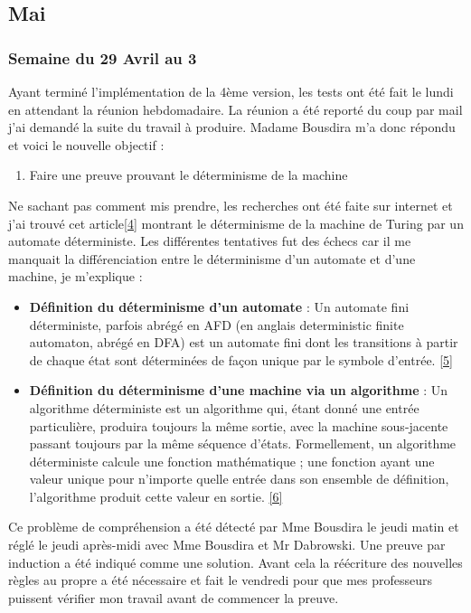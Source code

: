 \documentclass[10pt,a4paper]{article}
\begin{document}
		\subsection{Mai}
		
		\subsubsection{Semaine du 29 Avril au 3}
		Ayant terminé l'implémentation de la 4ème version, les tests ont été fait le lundi en attendant la réunion hebdomadaire. La réunion a été reporté du coup par mail j'ai demandé la suite du travail à produire. Madame Bousdira m'a donc répondu et voici le nouvelle objectif :
		\begin{enumerate}
			\item Faire une preuve prouvant le déterminisme de la machine
		\end{enumerate} 
		\bigbreak
		Ne sachant pas comment mis prendre, les recherches ont été faite sur internet et j'ai trouvé cet article\hyperref[Turing]{[4]} montrant le déterminisme de la machine de Turing par un automate déterministe. Les différentes tentatives fut des échecs car il me manquait la différenciation entre le déterminisme d'un automate et d'une machine, je m'explique :
		\begin{itemize}
			\item[] \textbf{Définition du déterminisme d'un automate} : Un automate fini déterministe, parfois abrégé en AFD (en anglais deterministic finite automaton, abrégé en DFA) est un automate fini dont les transitions à partir de chaque état sont déterminées de façon unique par le symbole d'entrée. \hyperref[AFD]{[5]}
			\item[] \textbf{Définition du déterminisme d'une machine via un algorithme} : Un algorithme déterministe est un algorithme qui, étant donné une entrée particulière, produira toujours la même sortie, avec la machine sous-jacente passant toujours par la même séquence d'états. 
			\smallbreak
			Formellement, un algorithme déterministe calcule une fonction mathématique ; une fonction ayant une valeur unique pour n'importe quelle entrée dans son ensemble de définition, l'algorithme produit cette valeur en sortie. \hyperref[MFD]{[6]}
		\end{itemize} 
		\medbreak
		Ce problème de compréhension a été détecté par Mme Bousdira le jeudi matin et réglé le jeudi après-midi avec Mme Bousdira et Mr Dabrowski. Une preuve par induction a été indiqué comme une solution.\smallbreak
		Avant cela la réécriture des nouvelles règles au propre a été nécessaire et fait le vendredi pour que mes professeurs puissent vérifier mon travail avant de commencer la preuve.  
		
\end{document}
